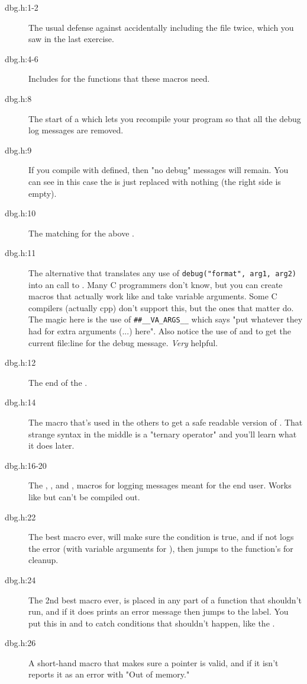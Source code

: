 \begin{description}
\item[dbg.h:1-2] The usual defense against accidentally including the file
    twice, which you saw in the last exercise.
\item[dbg.h:4-6] Includes for the functions that these macros need.
\item[dbg.h:8] The start of a  which lets you recompile your
    program so that all the debug log messages are removed.
\item[dbg.h:9] If you compile with  defined, then "no debug" messages
    will remain.  You can see in this case the  is just
    replaced with nothing (the right side is empty).
\item[dbg.h:10] The matching  for the above .
\item[dbg.h:11] The alternative  that translates any use
    of \verb|debug("format", arg1, arg2)| into an  call 
    to .  Many C programmers don't know, but you can create
    macros that actually work like  and take variable arguments.
    Some C compilers (actually cpp) don't support this, but the ones that matter do.
    The magic here is the use of \verb|##__VA_ARGS__| which says 
    "put whatever they had for extra arguments (...) here".  Also notice 
    the use of  and  to get the
    current file:line for the debug message.  \emph{Very} helpful.
\item[dbg.h:12] The end of the .
\item[dbg.h:14] The  macro that's used in the others to get a
    safe readable version of .  That strange syntax in the
    middle is a "ternary operator" and you'll learn what it does later.
\item[dbg.h:16-20] The , , and ,
    macros for logging messages meant for the end user.  Works
    like  but can't be compiled out.
\item[dbg.h:22] The best macro ever,  will make sure the condition
     is true, and if not logs the error  (with variable
    arguments for ), then jumps to the function's 
    for cleanup.
\item[dbg.h:24] The 2nd best macro ever,  is placed in any part of a
    function that shouldn't run, and if it does prints an error message then
    jumps to the  label.  You put this in 
    and  to catch conditions that shouldn't happen,
    like the .
\item[dbg.h:26] A short-hand macro  that makes sure a pointer is 
    valid, and if it isn't reports it as an error with "Out of memory."


\end{description}
